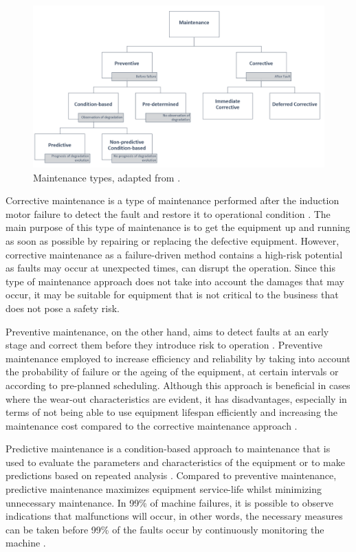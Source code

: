 \begin{figure}[h]
	\centering
	\includegraphics[width=400pt,keepaspectratio=true]{./fig/maintenance.PNG}
	\caption{Maintenance types, adapted from \cite{en201713306}.}	
	\label{maintenance}
\end{figure}

Corrective maintenance is a type of maintenance performed after the induction motor failure to detect the fault and restore it to operational condition \cite{en201713306}. The main purpose of this type of maintenance is to get the equipment up and running as soon as possible by repairing or replacing the defective equipment. However, corrective maintenance as a failure-driven method contains a high-risk potential as faults may occur at unexpected times, can disrupt the operation. Since this type of maintenance approach does not take into account the damages that may occur, it may be suitable for equipment that is not critical to the business that does not pose a safety risk.

Preventive maintenance, on the other hand, aims to detect faults at an early stage and correct them before they introduce risk to operation \cite{en201713306}. Preventive maintenance employed to increase efficiency and reliability by taking into account the probability of failure or the ageing of the equipment, at certain intervals or according to pre-planned scheduling. Although this approach is beneficial in cases where the wear-out characteristics are evident, it has disadvantages, especially in terms of not being able to use equipment lifespan efficiently and increasing the maintenance cost compared to the corrective maintenance approach \cite{AHMAD}.

Predictive maintenance is a condition-based approach to maintenance that is used to evaluate the parameters and characteristics of the equipment or to make predictions based on repeated analysis \cite{en201713306}. Compared to preventive maintenance, predictive maintenance maximizes equipment service-life whilst minimizing unnecessary maintenance. In 99\% of machine failures, it is possible to observe indications that malfunctions will occur, in other words, the necessary measures can be taken before 99\% of the faults occur by continuously monitoring the machine \cite{AHMAD}.

